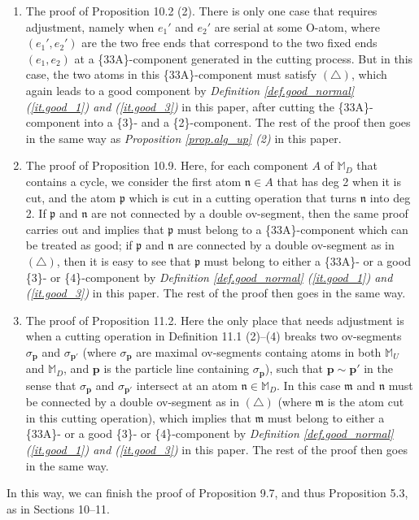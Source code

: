 \documentclass[10pt, reqno]{amsart}
\newcommand{\pb}{{\boldsymbol{p}}}
\newcommand{\Mb}{\mathbb M}
\newcommand{\mf}{\mathfrak m}
\newcommand{\pf}{\mathfrak p}
\newcommand{\nf}{\mathfrak n}
\theoremstyle{definition}
\theoremstyle{remark}
\numberwithin{equation}{section}
\begin{document}
\begin{enumerate}
\item The proof of Proposition 10.2 (2). There is only one case that requires adjustment, namely when $e_1'$ and $e_2'$ are serial at some O-atom, where $(e_1',e_2')$ are the two free ends that correspond to the two fixed ends $(e_1,e_2)$ at a \{33A\}-component generated in the cutting process. But in this case, the two atoms in this \{33A\}-component must satisfy $(\triangle)$, which again leads to a good component by \emph{Definition \ref{def.good_normal} (\ref{it.good_1}) and (\ref{it.good_3})} in this paper, after cutting the \{33A\}-component into a \{3\}- and a \{2\}-component. The rest of the proof then goes in the same way as \emph{Proposition \ref{prop.alg_up} (2)} in this paper.
\item The proof of Proposition 10.9. Here, for each component $A$ of $\Mb_D$ that contains a cycle, we consider the first atom $\nf\in A$ that has deg 2 when it is cut, and the atom $\pf$ which is cut in a cutting operation that turns $\nf$ into deg 2. If $\pf$ and $\nf$ are not connected by a double ov-segment, then the same proof carries out and implies that $\pf$ must belong to a \{33A\}-component which can be treated as good; if $\pf$ and $\nf$ are connected by a double ov-segment as in $(\triangle)$, then it is easy to see that $\pf$ must belong to either a \{33A\}- or a good \{3\}- or \{4\}-component by \emph{Definition \ref{def.good_normal} (\ref{it.good_1}) and (\ref{it.good_3})} in this paper. The rest of the proof then goes in the same way.
\item The proof of Proposition 11.2. Here the only place that needs adjustment is when a cutting operation in Definition 11.1 (2)--(4) breaks two ov-segments $\sigma_\pb$ and $\sigma_{\pb'}$ (where $\sigma_\pb$ are maximal ov-segments containg atoms in both $\Mb_U$ and $\Mb_D$, and $\pb$ is the particle line containing $\sigma_\pb$), such that $\pb\sim\pb'$ in the sense that $\sigma_\pb$ and $\sigma_{\pb'}$ intersect at an atom $\nf\in\Mb_D$. In this case $\mf$ and $\nf$ must be connected by a double ov-segment as in $(\triangle)$ (where $\mf$ is the atom cut in this cutting operation), which implies that $\mf$ must belong to either a \{33A\}- or a good \{3\}- or \{4\}-component by \emph{Definition \ref{def.good_normal} (\ref{it.good_1}) and (\ref{it.good_3})} in this paper. The rest of the proof then goes in the same way.
\end{enumerate}

In this way, we can finish the proof of Proposition 9.7, and thus Proposition 5.3, as in Sections 10--11.
\end{document}
